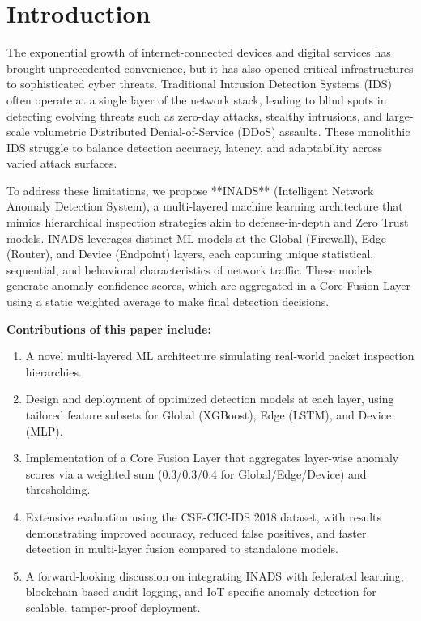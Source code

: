 \documentclass[conference]{IEEEtran}
\begin{document}
\section{Introduction}

The exponential growth of internet-connected devices and digital services has brought unprecedented convenience, but it has also opened critical infrastructures to sophisticated cyber threats. Traditional Intrusion Detection Systems (IDS) often operate at a single layer of the network stack, leading to blind spots in detecting evolving threats such as zero-day attacks, stealthy intrusions, and large-scale volumetric Distributed Denial-of-Service (DDoS) assaults. These monolithic IDS struggle to balance detection accuracy, latency, and adaptability across varied attack surfaces.

To address these limitations, we propose **INADS** (Intelligent Network Anomaly Detection System), a multi-layered machine learning architecture that mimics hierarchical inspection strategies akin to defense-in-depth and Zero Trust models. INADS leverages distinct ML models at the Global (Firewall), Edge (Router), and Device (Endpoint) layers, each capturing unique statistical, sequential, and behavioral characteristics of network traffic. These models generate anomaly confidence scores, which are aggregated in a Core Fusion Layer using a static weighted average to make final detection decisions.

\textbf{Contributions of this paper include:}
\begin{enumerate}
    \item A novel multi-layered ML architecture simulating real-world packet inspection hierarchies.
    \item Design and deployment of optimized detection models at each layer, using tailored feature subsets for Global (XGBoost), Edge (LSTM), and Device (MLP).
    \item Implementation of a Core Fusion Layer that aggregates layer-wise anomaly scores via a weighted sum (0.3/0.3/0.4 for Global/Edge/Device) and thresholding.
    \item Extensive evaluation using the CSE-CIC-IDS 2018 dataset, with results demonstrating improved accuracy, reduced false positives, and faster detection in multi-layer fusion compared to standalone models.
    \item A forward-looking discussion on integrating INADS with federated learning, blockchain-based audit logging, and IoT-specific anomaly detection for scalable, tamper-proof deployment.
\end{enumerate}
\end{document}
